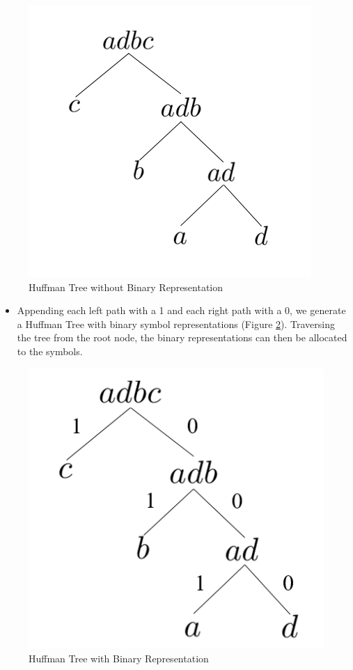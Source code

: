 \documentclass[12pt]{article}
\begin{document}
	\begin{figure}[H]
		\centering
		\includegraphics[scale=0.6]{../Images/Huffman_tree_no_binary.png}
		\caption{Huffman Tree without Binary Representation}
		\label{fig:huff_no_bin}
	\end{figure}
	\begin{itemize}
		\item Appending each left path with a 1 and each right path with a 0, we generate a Huffman Tree with binary symbol representations (Figure \ref{fig:huff_with_bin}). Traversing the tree from the root node, the binary representations can then be allocated to the symbols.
	\end{itemize}
	
	\begin{figure}[H]
		\centering
		\includegraphics[scale=0.5]{../Images/Huffman_tree_with_binary.png}
		\caption{Huffman Tree with Binary Representation}
		\label{fig:huff_with_bin}
	\end{figure}
\end{document}
